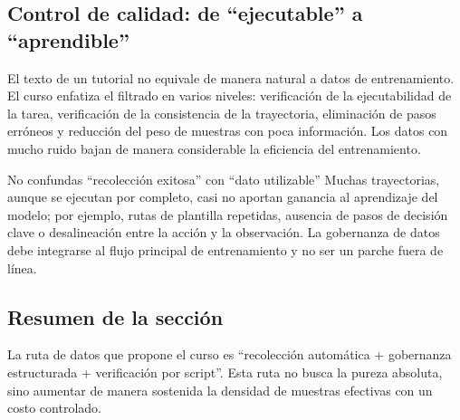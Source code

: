 \subsection{Control de calidad: de ``ejecutable'' a ``aprendible''}
El texto de un tutorial no equivale de manera natural a datos de entrenamiento. El curso enfatiza el filtrado en varios niveles: verificación de la ejecutabilidad de la tarea, verificación de la consistencia de la trayectoria, eliminación de pasos erróneos y reducción del peso de muestras con poca información. Los datos con mucho ruido bajan de manera considerable la eficiencia del entrenamiento.

\begin{warningbox}{No confundas ``recolección exitosa'' con ``dato utilizable''}
Muchas trayectorias, aunque se ejecutan por completo, casi no aportan ganancia al aprendizaje del modelo; por ejemplo, rutas de plantilla repetidas, ausencia de pasos de decisión clave o desalineación entre la acción y la observación. La gobernanza de datos debe integrarse al flujo principal de entrenamiento y no ser un parche fuera de línea.
\end{warningbox}

\subsection{Resumen de la sección}
La ruta de datos que propone el curso es ``recolección automática + gobernanza estructurada + verificación por script''. Esta ruta no busca la pureza absoluta, sino aumentar de manera sostenida la densidad de muestras efectivas con un costo controlado.

